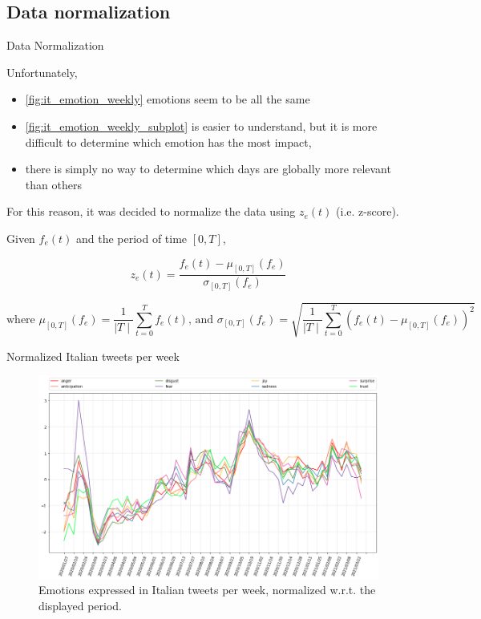 \documentclass[8pt]{beamer}  %
\begin{document}
\subsection{Data normalization}
\begin{frame}{Data Normalization}

    Unfortunately,

    \begin{itemize}
        \item \cref{fig:it_emotion_weekly} emotions seem to be all the same
        \item \cref{fig:it_emotion_weekly_subplot} is easier to understand, but it is more difficult to determine which emotion has the most impact,
        \item there is simply no way to determine which days are globally more relevant than others
    \end{itemize}
	
	For this reason, it was decided to normalize the data using \(z_e(t)\) (i.e. z-score).
	
	\begin{definition}
	    Given \(f_e(t)\) and the period of time \([0,T]\),
	    
	    \[z_e(t) = \frac{f_e(t) - \mu_{[0,T]}(f_e)}{\sigma_{[0,T]}(f_e)}\]
	    
	    \[\text{where } \mu_{[0,T]}(f_e) = \frac{1}{\mid T \mid} \sum_{t =0}^{T} f_e(t) \text{, and } \sigma_{[0,T]}(f_e) = \sqrt{\frac{1}{\mid T \mid} \sum_{t = 0}^{T} \left( f_e(t) - \mu_{[0,T]}(f_e) \right)^2 }\] 
	\end{definition}

\end{frame}

\begin{frame}{Normalized Italian tweets per week}
	
	\begin{figure}[h]
    	\includegraphics[scale=.3]{assets/img/it_emotions_normalized.png}
    	\caption{Emotions expressed in Italian tweets per week, normalized w.r.t. the displayed period.}
    	\label{fig:it_emotion_weekly_norm}
    \end{figure}

\end{frame}
\end{document}
